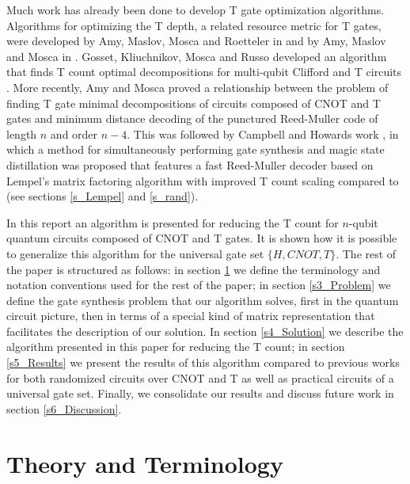 \documentclass{article}
\theoremstyle{definition}
\theoremstyle{problem}
\theoremstyle{lemma}
\begin{document}
	Much work has already been done to develop T gate optimization algorithms. Algorithms for optimizing the T depth, a related resource metric for T gates, were developed by Amy, Maslov, Mosca and Roetteler in \cite{3_Amy_2013} and by Amy, Maslov and Mosca in \cite{4_Amy_2013}. Gosset, Kliuchnikov, Mosca and Russo developed an algorithm that finds T count optimal decompositions for multi-qubit Clifford and T circuits \cite{5_Gosset_2013}.
	More recently, Amy and Mosca \cite{8_Amy_2016} proved a relationship between the problem of finding T gate minimal decompositions of circuits composed of CNOT and T gates and minimum distance decoding of the punctured Reed-Muller code of length $n$ and order $n-4$. This was followed by Campbell and Howards work \cite{1_Campbell_2017}, in which a method for simultaneously performing gate synthesis and magic state distillation was proposed that features a fast Reed-Muller decoder based on Lempel's matrix factoring algorithm with improved T count scaling compared to \cite{8_Amy_2016} (see sections \ref{s_Lempel} and \ref{s_rand}).
	
	In this report an algorithm is presented for reducing the T count for $n$-qubit quantum circuits composed of CNOT and T gates. It is shown how it is possible to generalize this algorithm for the universal gate set $\{H, CNOT, T\}$. The rest of the paper is structured as follows: in section \ref{s2_Theory} we define the terminology and notation conventions used for the rest of the paper; in section \ref{s3_Problem} we define the gate synthesis problem that our algorithm solves, first in the quantum circuit picture, then in terms of a special kind of matrix representation that facilitates the description of our solution. In section \ref{s4_Solution} we describe the algorithm presented in this paper for reducing the T count; in section \ref{s5_Results} we present the results of this algorithm compared to previous works for both randomized circuits over CNOT and T as well as practical circuits of a universal gate set. Finally, we consolidate our results and discuss future work in section \ref{s6_Discussion}.
	
	\FloatBarrier
	\section{Theory and Terminology}
	\label{s2_Theory}
\end{document}
